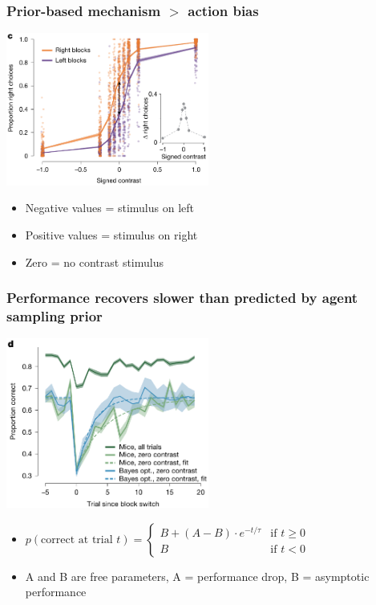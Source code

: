 \documentclass{beamer}
\begin{document}
\begin{frame}
  \frametitle{Prior-based mechanism $>$ action bias}
  \begin{center}
    \includegraphics[width=0.5\textwidth, keepaspectratio]{./figure1c}
  \end{center}
  \begin{itemize}
    \item Negative values = stimulus on left
    \item Positive values = stimulus on right
    \item Zero = no contrast stimulus
  \end{itemize}
\end{frame}

\begin{frame}
  \frametitle{Performance recovers slower than predicted by agent sampling prior}
  \begin{center}
    \includegraphics[width=0.5\textwidth, keepaspectratio]{./figure1d}
  \end{center}
  \begin{itemize}
    \item $p(\text{correct at trial } t) =
\begin{cases}
B + (A-B) \cdot e^{-t/\tau} & \text{if } t \ge 0 \\
B & \text{if } t < 0
\end{cases}$
  \item A and B are free parameters, A = performance drop, B = asymptotic performance
  \end{itemize}
\end{frame}
\end{document}

